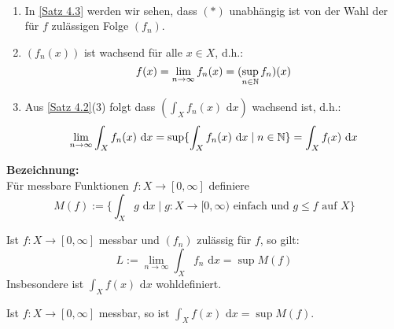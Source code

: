 \documentclass[a4paper,twoside,DIV15,BCOR12mm,chapterprefix=true,headings=onelinechapter]{scrbook}
\begin{document}
\begin{bemerkung}\ 
\begin{enumerate}
\item In \ref{Satz 4.3} werden wir sehen, dass $(*)$ unabhängig ist von der Wahl der für $f$ zulässigen Folge $(f_n)$.
\item $(f_n(x))$ ist wachsend für alle $x\in X$, d.h.:
\[f(x)=\lim_{n\to\infty} f_n(x)=(\sup_{n\in\mathbb{N}} f_n)(x)\]
\item Aus \ref{Satz 4.2}(3) folgt dass $(\int_X f_n(x)\text{ d}x)$ wachsend ist, d.h.:
\[\lim_{n\to\infty} \int_X f_n(x)\text{ d}x = \sup\{\int_X f_n(x)\text{ d}x\mid n\in\mathbb{N}\}=\int_X f_(x)\text{ d}x\]
\end{enumerate}
\end{bemerkung}

\textbf{Bezeichnung:}\\
Für messbare Funktionen $f:X\to[0,\infty]$ definiere
\[M(f):=\{\int_X g\text{ d}x\mid g:X\to[0,\infty) \text{ einfach und }g\le f\text{ auf }X\}\]

\begin{satz}
\label{Satz 4.3}
Ist $f:X\to[0,\infty]$ messbar und $(f_n)$ zulässig für $f$, so gilt:
\[L:=\lim_{n\to\infty}\int_X f_n\text{ d}x=\sup M(f)\]
Insbesondere ist $\int_X f(x) \text{ d}x$ wohldefiniert.
\end{satz}

\begin{folgerungen}
\label{Folgerung 4.4}
Ist $f:X\to[0,\infty]$ messbar, so ist $\int_X f(x) \text{ d}x=\sup M(f)$.
\end{folgerungen}
\end{document}
